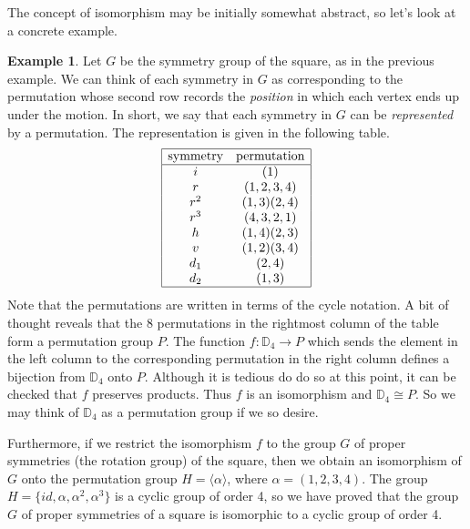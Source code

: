 \documentclass[11pt]{article}
\theoremstyle{definition}
\newtheorem{example}[thm]{Example}
\newcommand{\gen}[1]{\langle #1 \rangle}
\newcommand{\D}{\mathbb{D}}
\begin{document}
The concept of isomorphism may be initially somewhat abstract, so let's
look at a concrete example. 
 

\begin{example}
Let $G$ be the symmetry group of the square, as in the previous
example.  We can think of each symmetry in $G$ as corresponding to the
permutation whose second row records the {\em position} in which each
vertex ends up under the motion. In short, we say that each symmetry
in $G$ can be \emph{represented} by a permutation. The representation
is given in the following table.
\[
\begin{array}{|cc|} \hline 
  \text{symmetry} & \text{permutation} \\ \hline 
  i & (1)\\
  r & (1,2,3,4)\\
  r^2 & (1,3)(2,4)\\
  r^3 & (4,3,2,1)\\
  h & (1,4)(2,3)\\
  v & (1,2)(3,4)\\
  d_1 & (2,4)\\
  d_2 & (1,3)\\ \hline
\end{array}
\]
Note that the permutations are written in terms of the cycle notation.
A bit of thought reveals that the 8 permutations in the rightmost
column of the table form a permutation group $P$. The function $f:
\D_4 \to P$ which sends the element in the left column to the
corresponding permutation in the right column defines a bijection from
$\D_4$ onto $P$. Although it is tedious do do so at this point, it can
be checked that $f$ preserves products. Thus $f$ is an isomorphism and
$\D_4 \cong P$. So we may think of $\D_4$ as a permutation group if we
so desire.

Furthermore, if we restrict the isomorphism $f$ to the group $G$ of
proper symmetries (the rotation group) of the square, then we obtain
an isomorphism of $G$ onto the permutation group $H = \gen{\alpha}$,
where $\alpha = (1,2,3,4)$. The group $H = \{ id, \alpha, \alpha^2,
\alpha^3 \}$ is a cyclic group of order 4, so we have proved that the
group $G$ of proper symmetries of a square is isomorphic to a cyclic
group of order 4.
\end{example}
\end{document}
